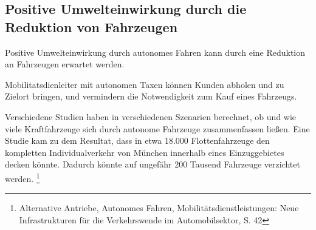 \subsection{Positive Umwelteinwirkung durch die Reduktion von Fahrzeugen}
Positive Umwelteinwirkung durch autonomes Fahren kann durch eine
Reduktion an Fahrzeugen erwartet werden.

Mobilitatsdienleiter mit autonomen Taxen können
Kunden abholen und zu Zielort bringen,
und vermindern die Notwendigkeit zum Kauf eines Fahrzeugs.

Verschiedene Studien haben in verschiedenen Szenarien berechnet, ob und wie viele Kraftfahrzeuge sich durch autonome Fahrzeuge zusammenfassen ließen.
Eine Studie kam zu dem Resultat, dass in etwa 18.000 Flottenfahrzeuge den kompletten Individualverkehr von München innerhalb eines Einzuggebietes decken könnte.
Dadurch könnte auf ungefähr 200 Tausend Fahrzeuge verzichtet werden.
\footnote{Alternative Antriebe, Autonomes Fahren,
	Mobilitätsdienstleistungen: Neue Infrastrukturen für
	die Verkehrswende im Automobilsektor, S. 42}





































